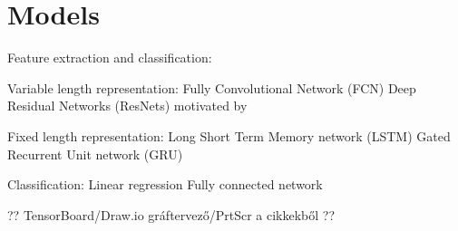 \section{Models}

Feature extraction and classification:

Variable length representation:
Fully Convolutional Network (FCN) \cite{lecun1995convolutional, mittelman2015time}
Deep Residual Networks (ResNets) motivated by \cite{he2016deep, wang2016time}

Fixed length representation:
Long Short Term Memory network (LSTM)  \cite{hochreiter1997long, malhotra2015long}
Gated Recurrent Unit network (GRU) \cite{chung2014empirical}

Classification:
Linear regression
Fully connected network \cite{girshick2014rich}

?? TensorBoard/Draw.io gráftervező/PrtScr a cikkekből ??
